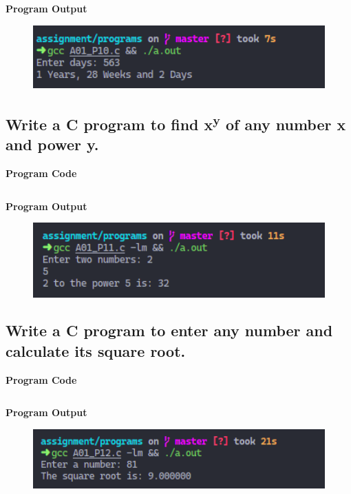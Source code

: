 \documentclass[a4paper, onecolumn]{article}
\begin{document}
\inputminted{C}{programs/A01_P10.c}

\textbf{Program Output}

\begin{figure}[h]
  \includegraphics[width=12cm]{A01_P10}
\end{figure}

\newpage



\subsection{Write a C program to find x\textsuperscript{y} of any number x and power y.}
\textbf{Program Code}

\inputminted{C}{programs/A01_P11.c}

\textbf{Program Output}

\begin{figure}[h]
  \includegraphics[width=12cm]{A01_P11}
\end{figure}

\newpage



\subsection{Write a C program to enter any number and calculate its square root.}
\textbf{Program Code}

\inputminted{C}{programs/A01_P12.c}

\textbf{Program Output}

\begin{figure}[h]
  \includegraphics[width=12cm]{A01_P12}
\end{figure}
\end{document}
